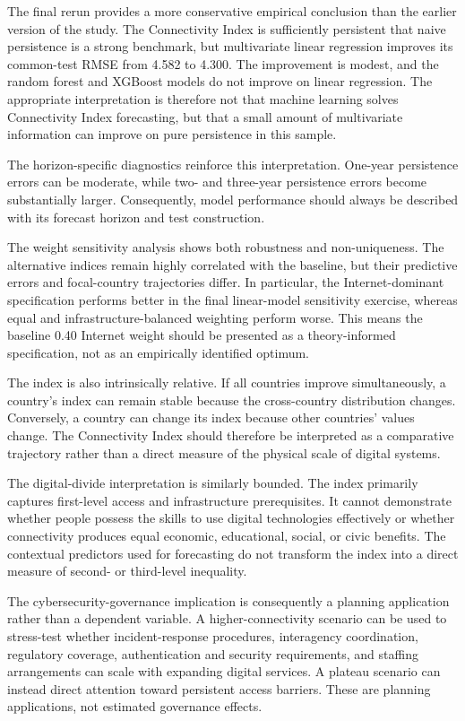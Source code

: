 \documentclass[conference]{IEEEtran}
\begin{document}
The final rerun provides a more conservative empirical conclusion than the earlier version of the study. The Connectivity Index is sufficiently persistent that naive persistence is a strong benchmark, but multivariate linear regression improves its common-test RMSE from 4.582 to 4.300. The improvement is modest, and the random forest and XGBoost models do not improve on linear regression. The appropriate interpretation is therefore not that machine learning solves Connectivity Index forecasting, but that a small amount of multivariate information can improve on pure persistence in this sample.

The horizon-specific diagnostics reinforce this interpretation. One-year persistence errors can be moderate, while two- and three-year persistence errors become substantially larger. Consequently, model performance should always be described with its forecast horizon and test construction.

The weight sensitivity analysis shows both robustness and non-uniqueness. The alternative indices remain highly correlated with the baseline, but their predictive errors and focal-country trajectories differ. In particular, the Internet-dominant specification performs better in the final linear-model sensitivity exercise, whereas equal and infrastructure-balanced weighting perform worse. This means the baseline 0.40 Internet weight should be presented as a theory-informed specification, not as an empirically identified optimum.

The index is also intrinsically relative. If all countries improve simultaneously, a country's index can remain stable because the cross-country distribution changes. Conversely, a country can change its index because other countries' values change. The Connectivity Index should therefore be interpreted as a comparative trajectory rather than a direct measure of the physical scale of digital systems.

The digital-divide interpretation is similarly bounded. The index primarily captures first-level access and infrastructure prerequisites. It cannot demonstrate whether people possess the skills to use digital technologies effectively or whether connectivity produces equal economic, educational, social, or civic benefits. The contextual predictors used for forecasting do not transform the index into a direct measure of second- or third-level inequality.

The cybersecurity-governance implication is consequently a planning application rather than a dependent variable. A higher-connectivity scenario can be used to stress-test whether incident-response procedures, interagency coordination, regulatory coverage, authentication and security requirements, and staffing arrangements can scale with expanding digital services. A plateau scenario can instead direct attention toward persistent access barriers. These are planning applications, not estimated governance effects.
\end{document}
